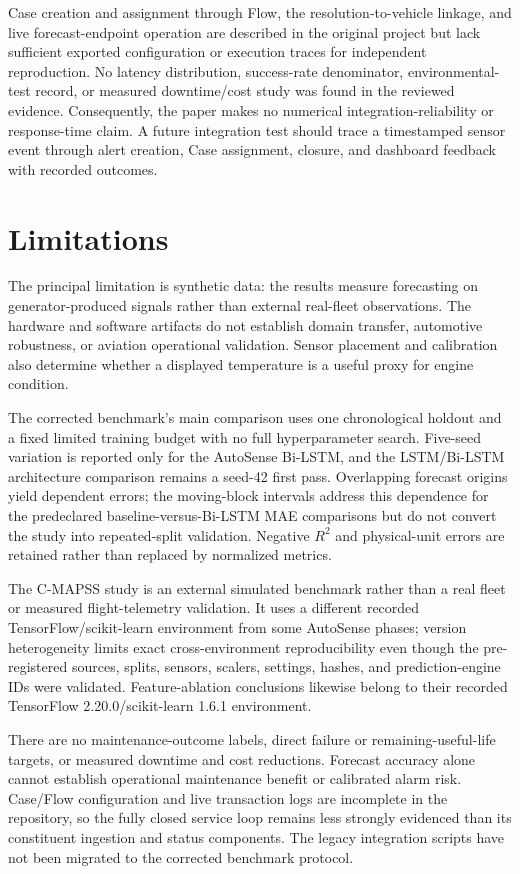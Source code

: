 \documentclass[conference]{IEEEtran}
\begin{document}
Case creation and assignment through Flow, the resolution-to-vehicle linkage, and live forecast-endpoint operation are described in the original project but lack sufficient exported configuration or execution traces for independent reproduction. No latency distribution, success-rate denominator, environmental-test record, or measured downtime/cost study was found in the reviewed evidence. Consequently, the paper makes no numerical integration-reliability or response-time claim. A future integration test should trace a timestamped sensor event through alert creation, Case assignment, closure, and dashboard feedback with recorded outcomes.

\section{Limitations}
The principal limitation is synthetic data: the results measure forecasting on generator-produced signals rather than external real-fleet observations. The hardware and software artifacts do not establish domain transfer, automotive robustness, or aviation operational validation. Sensor placement and calibration also determine whether a displayed temperature is a useful proxy for engine condition.

The corrected benchmark's main comparison uses one chronological holdout and a
fixed limited training budget with no full hyperparameter search. Five-seed
variation is reported only for the AutoSense Bi-LSTM, and the LSTM/Bi-LSTM
architecture comparison remains a seed-42 first pass. Overlapping forecast
origins yield dependent errors; the moving-block intervals address this
dependence for the predeclared baseline-versus-Bi-LSTM MAE comparisons but do
not convert the study into repeated-split validation. Negative $R^2$ and
physical-unit errors are retained rather than replaced by normalized metrics.

The C-MAPSS study is an external simulated benchmark rather than a real fleet
or measured flight-telemetry validation. It uses a different recorded
TensorFlow/scikit-learn environment from some AutoSense phases; version
heterogeneity limits exact cross-environment reproducibility even though the
pre-registered sources, splits, sensors, scalers, settings, hashes, and
prediction-engine IDs were validated. Feature-ablation conclusions likewise
belong to their recorded TensorFlow 2.20.0/scikit-learn 1.6.1 environment.

There are no maintenance-outcome labels, direct failure or remaining-useful-life targets, or measured downtime and cost reductions. Forecast accuracy alone cannot establish operational maintenance benefit or calibrated alarm risk. Case/Flow configuration and live transaction logs are incomplete in the repository, so the fully closed service loop remains less strongly evidenced than its constituent ingestion and status components. The legacy integration scripts have not been migrated to the corrected benchmark protocol.
\end{document}
